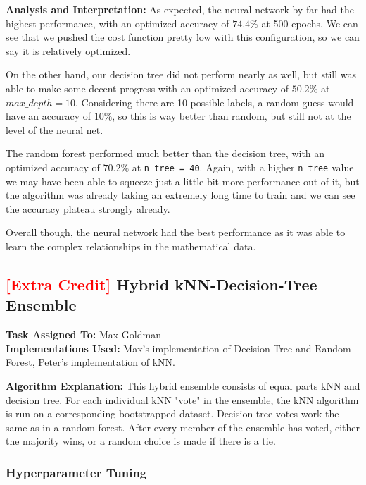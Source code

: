 \documentclass{article}
\begin{document}
\textbf{Analysis and Interpretation:}
As expected, the neural network by far had the highest performance, with an optimized accuracy of $74.4\%$ at 500 epochs. 
We can see that we pushed the cost function pretty low with this configuration, so we can say it is relatively optimized.

On the other hand, our decision tree did not perform nearly as well, but still was able to make some decent progress with an optimized accuracy of $50.2\%$ at $max\_depth = 10$.
Considering there are 10 possible labels, a random guess would have an accuracy of $10\%$, so this is way better than random, but still not at the level of the neural net.

The random forest performed much better than the decision tree, with an optimized accuracy of $70.2\%$ at \verb|n_tree = 40|. 
Again, with a higher \verb|n_tree| value we may have been able to squeeze just a little bit more performance out of it, but the algorithm was already taking an extremely long time to train and we can see the accuracy plateau strongly already.

Overall though, the neural network had the best performance as it was able to learn the complex relationships in the mathematical data.

\newpage



\subsection{\textcolor{red}{\textbf{[Extra Credit]}} Hybrid kNN-Decision-Tree Ensemble}

\textbf{Task Assigned To:} Max Goldman \\
\textbf{Implementations Used:} Max's implementation of Decision Tree and Random Forest, Peter's implementation of kNN.

\noindent\textbf{Algorithm Explanation:}
This hybrid ensemble consists of equal parts kNN and decision tree. 
For each individual kNN "vote" in the ensemble, the kNN algorithm is run on a corresponding bootstrapped dataset.
Decision tree votes work the same as in a random forest. 
After every member of the ensemble has voted, either the majority wins, or a random choice is made if there is a tie.



\subsubsection{Hyperparameter Tuning}
\end{document}
